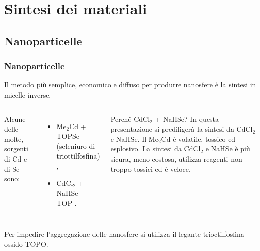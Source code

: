 \documentclass{beamer}
\begin{document}
\section{Sintesi dei materiali}\subsection{Nanoparticelle}
    \begin{frame}
      \frametitle{ 
 Nanoparticelle}
	Il metodo più semplice, economico e diffuso per produrre nanosfere è la sintesi in micelle inverse.
      \begin{columns}
	Alcune delle molte\citep{qd-CdSe-Cd}\citep{fv-CdSe-OA}\citep{lig-CdSe-P}\citep{lig-p3ht-CdSe-end}, sorgenti di Cd e di Se sono:
	\begin{itemize}
	  \item Me$_2$Cd + TOPSe (seleniuro di triottilfosfina) \citep{qd-CdSe-Cd},
	  \item CdCl$_2$ + NaHSe + TOP \citep{qd-CdSe-CdCl2}.
	\end{itemize}
	\pause
	  \begin{block}{Perché CdCl$_2$ + NaHSe?}
	    In questa presentazione si prediligerà la sintesi da CdCl$_2$ e NaHSe. Il Me$_2$Cd è volatile, tossico ed esplosivo. La sintesi da CdCl$_2$ e NaHSe è più sicura, meno costosa, utilizza reagenti non troppo tossici ed è veloce.
	  \end{block}
	\end{columns}\vskip 10pt
    \pause Per \alert{impedire l'aggregazione} delle nanosfere si utilizza il legante trioctilfosfina ossido TOPO.
    \end{frame}


    
    
    
\end{document}
